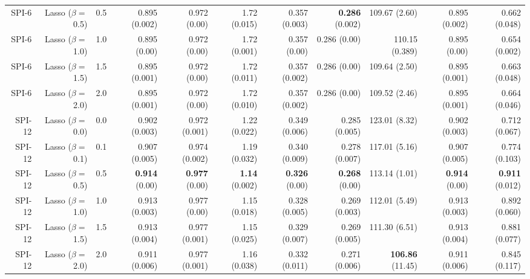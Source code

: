 \begin{table}
\begin{tabular}{rrrrrrrrrrr}
  SPI-6 & Lasso ($\beta = $0.5) &   0.5 &        0.895 (0.002) &        0.972 (0.00) &        1.72 (0.015) &        0.357 (0.003) & { \bf 0.286} (0.002) &         109.67 (2.60) &        0.895 (0.002) &        0.662 (0.048) \\
  SPI-6 & Lasso ($\beta = $1.0) &   1.0 &         0.895 (0.00) &        0.972 (0.00) &        1.72 (0.001) &         0.357 (0.00) &         0.286 (0.00) &        110.15 (0.389) &         0.895 (0.00) &        0.654 (0.002) \\
  SPI-6 & Lasso ($\beta = $1.5) &   1.5 &        0.895 (0.001) &        0.972 (0.00) &        1.72 (0.011) &        0.357 (0.002) &         0.286 (0.00) &         109.64 (2.50) &        0.895 (0.001) &        0.663 (0.048) \\
  SPI-6 & Lasso ($\beta = $2.0) &   2.0 &        0.895 (0.001) &        0.972 (0.00) &        1.72 (0.010) &        0.357 (0.002) &         0.286 (0.00) &         109.52 (2.46) &        0.895 (0.001) &        0.664 (0.046) \\
 SPI-12 & Lasso ($\beta = $0.0) &   0.0 &        0.902 (0.003) &       0.972 (0.001) &        1.22 (0.022) &        0.349 (0.006) &        0.285 (0.005) &         123.01 (8.32) &        0.902 (0.003) &        0.712 (0.067) \\
 SPI-12 & Lasso ($\beta = $0.1) &   0.1 &        0.907 (0.005) &       0.974 (0.002) &        1.19 (0.032) &        0.340 (0.009) &        0.278 (0.007) &         117.01 (5.16) &        0.907 (0.005) &        0.774 (0.103) \\
 SPI-12 & Lasso ($\beta = $0.5) &   0.5 &  { \bf 0.914} (0.00) & { \bf 0.977} (0.00) & { \bf 1.14} (0.002) &  { \bf 0.326} (0.00) &  { \bf 0.268} (0.00) &         113.14 (1.01) &  { \bf 0.914} (0.00) & { \bf 0.911} (0.012) \\
 SPI-12 & Lasso ($\beta = $1.0) &   1.0 &        0.913 (0.003) &        0.977 (0.00) &        1.15 (0.018) &        0.328 (0.005) &        0.269 (0.003) &         112.01 (5.49) &        0.913 (0.003) &        0.892 (0.060) \\
 SPI-12 & Lasso ($\beta = $1.5) &   1.5 &        0.913 (0.004) &       0.977 (0.001) &        1.15 (0.025) &        0.329 (0.007) &        0.269 (0.005) &         111.30 (6.51) &        0.913 (0.004) &        0.881 (0.077) \\
 SPI-12 & Lasso ($\beta = $2.0) &   2.0 &        0.911 (0.006) &       0.977 (0.001) &        1.16 (0.038) &        0.332 (0.011) &        0.271 (0.006) & { \bf 106.86} (11.45) &        0.911 (0.006) &        0.845 (0.117) \\
\bottomrule
\end{tabular}
\end{table}
